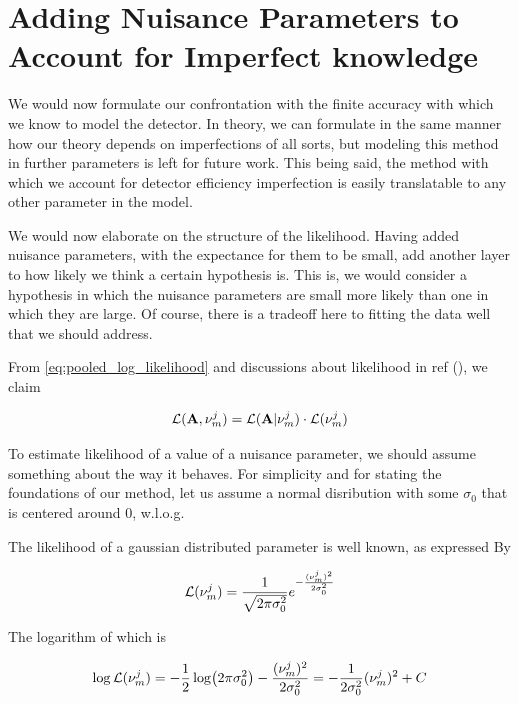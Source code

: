 \documentclass[../thesis.tex]{subfiles}
\begin{document}
\section{Adding Nuisance Parameters to Account for Imperfect knowledge}

We would now formulate our confrontation with the finite accuracy with which we know to model the detector. In theory, we can formulate in the same manner how our theory depends on imperfections of all sorts, but modeling this method in further parameters is left for future work. This being said, the method with which we account for detector efficiency imperfection is easily translatable to any other parameter in the model.

We would now elaborate on the structure of the likelihood. Having added nuisance parameters, with the expectance for them to be small, add another layer to how likely we think a certain hypothesis is. This is, we would consider a hypothesis in which the nuisance parameters are small more likely than one in which they are large. Of course, there is a tradeoff here to fitting the data well that we should address.

From \ref{eq:pooled_log_likelihood} and discussions about likelihood in ref (\cite{Italian_no_2_Learning_New_Physics_from_an_Imperfect_Machine}), we claim %

$$
\begin{aligned}
    \mathcal{L}({\mathbf{A}}, \nu^j_m) = \mathcal{L}({\mathbf{A}}| \nu^j_m) \cdot \mathcal{L}(\nu^j_m)
\end{aligned}
$$

To estimate likelihood of a value of a nuisance parameter, we should assume something about the way it behaves. For simplicity and for stating the foundations of our method, let us assume a normal disribution with some $\sigma_0$ that is centered around 0, w.l.o.g. 

The likelihood of a gaussian distributed parameter is well known, as expressed By

$$
\begin{aligned} \label{eq:gaussian_likelihood}
    \mathcal{L}(\nu^j_m) = \frac{1}{\sqrt{2 \pi \sigma_0^2}} e^{-\frac{(\nu^j_m)^2}{2 \sigma_0^2}}
\end{aligned}
$$

The logarithm of which is

$$
\begin{aligned} \label{eq:gaussian_log_likelihood}
    \log\mathcal{L}(\nu^j_m) = -\frac{1}{2} \log(2 \pi \sigma_0^2) - \frac{(\nu^j_m)^2}{2 \sigma_0^2} = - \frac{1}{2 \sigma_0^2} (\nu^j_m)^2 + C
\end{aligned}
$$
\end{document}
